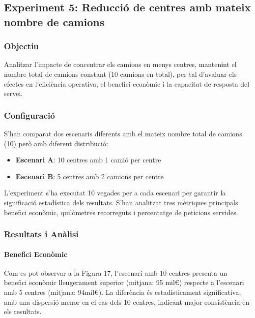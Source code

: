 \subsection{Experiment 5: Reducció de centres amb mateix nombre de camions}

\vspace{0.5cm}


\subsubsection{Objectiu}
Analitzar l'impacte de concentrar els camions en menys centres, mantenint el nombre total de camions constant (10 camions en total), per tal d'avaluar els efectes en l'eficiència operativa, el benefici econòmic i la capacitat de resposta del servei.


\vspace{0.5cm}


\subsubsection{Configuració}
S'han comparat dos escenaris diferents amb el mateix nombre total de camions (10) però amb diferent distribució:
\begin{itemize}
    \item \textbf{Escenari A}: 10 centres amb 1 camió per centre
    \item \textbf{Escenari B}: 5 centres amb 2 camions per centre
\end{itemize}

L'experiment s'ha executat 10 vegades per a cada escenari per garantir la significació estadística dels resultats. S'han analitzat tres mètriques principals: benefici econòmic, quilòmetres recorreguts i percentatge de peticions servides.

\vspace{0.5cm}


\subsubsection{Resultats i Anàlisi}

\paragraph{Benefici Econòmic}

Com es pot observar a la Figura 17, l'escenari amb 10 centres presenta un benefici econòmic lleugerament superior (mitjana: 95 mil€) respecte a l'escenari amb 5 centres (mitjana: 94mil€). La diferència és estadísticament significativa, amb una dispersió menor en el cas dels 10 centres, indicant major consistència en els resultats.


